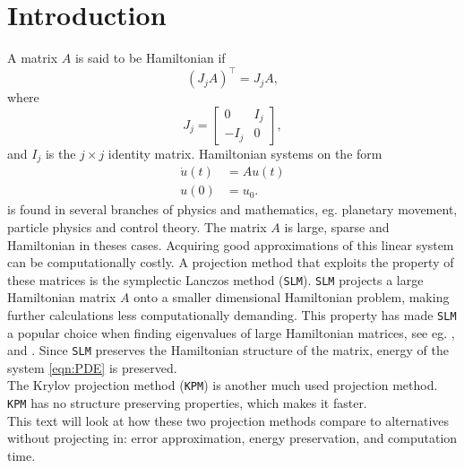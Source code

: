\chapter{Introduction} %
A matrix $A$ is said to be Hamiltonian if  \cite{Hamiltonian}
\begin{equation*}
(J_jA)^{\top} = J_j A,
\end{equation*}
where
\begin{equation*}
J_j = 
\begin{bmatrix}
0&I_j\\-I_j&0
\end{bmatrix},
\end{equation*}
and $I_j$ is the $j \times j$ identity matrix.
Hamiltonian systems on the form 
\begin{equation} 
\begin{aligned}
\dot{u}(t) &= A u(t)\\
u(0)&= u_0.
\end{aligned}
\label{eqn:PDE}
\end{equation} is found in several branches of physics and mathematics, eg. planetary movement, particle physics and control theory.
The matrix $A$ is large, sparse and Hamiltonian in theses cases. Acquiring good approximations of this linear system can be computationally costly. A projection method that exploits the property of these matrices is the symplectic Lanczos method (\texttt{SLM}). \texttt{SLM} projects a large Hamiltonian matrix $A$ onto a smaller dimensional Hamiltonian problem, making further calculations less computationally demanding. This property has made \texttt{SLM} a popular choice when finding eigenvalues of large Hamiltonian matrices, see eg. \cite{SLM1}, \cite{SLM2} and \cite{SLM3}. Since \texttt{SLM} preserves the Hamiltonian structure of the matrix, energy of the system \eqref{eqn:PDE} is preserved.\\
The Krylov projection method (\texttt{KPM}) is another much used projection method. \texttt{KPM} has no structure preserving properties, which makes it faster. \\
This text will look at how these two projection methods compare to alternatives without projecting in: error approximation, energy preservation, and computation time. \\
